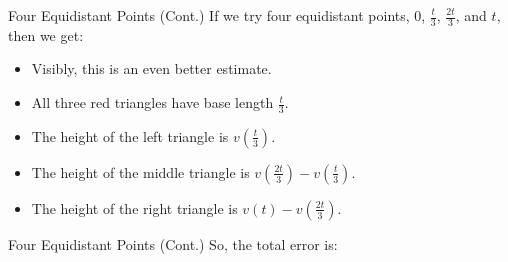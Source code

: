 \documentclass[Lecture.tex]{subfiles}
\begin{document}
\begin{frame}{Four Equidistant  Points (Cont.)}
  If we try four equidistant points, 0, $\frac{t}{3}$, $\frac{2t}{3}$, and $t$, then we get:\\
  \vfill
  \begin{minipage}{0.48\linewidth}
  \end{minipage}
  \hfill
  \begin{minipage}{0.48\linewidth}
    \begin{itemize}
    \item<3->
      Visibly, this is an even better estimate.
    \item<4->
      All three red triangles have base length $\frac{t}{3}$.
    \item<5->
      The height of the left triangle is $v\left(\frac{t}{3}\right)$.
    \item<6->
      The height of the middle triangle is $v\left(\frac{2t}{3}\right) - v\left(\frac{t}{3}\right)$.
    \item<7->
      The height of the right triangle is $v(t) - v\left(\frac{2t}{3}\right)$.
    \end{itemize}
  \end{minipage}
\end{frame}

\begin{frame}{Four Equidistant Points (Cont.)}
  So, the total error is:\\
\end{frame}
\end{document}
